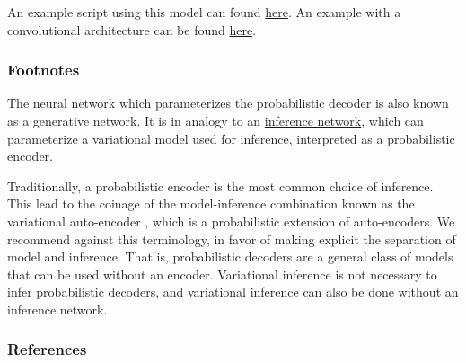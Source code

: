 An example script using this model can found
\href{https://github.com/blei-lab/edward/blob/master/examples/vae.py}
{here}. An example with a convolutional architecture can be found
\href{https://github.com/blei-lab/edward/blob/master/examples/vae_convolutional_prettytensor.py}
{here}.

\subsubsection{Footnotes}

The neural network which parameterizes the probabilistic decoder is
also known as a generative network. It is in analogy to an
\href{/tutorials/inference-networks}{inference network}, which
can parameterize a variational model used for inference,
interpreted as a probabilistic encoder.

Traditionally, a probabilistic encoder is the most common
choice of inference. This lead to the coinage of the model-inference
combination known as the variational auto-encoder
\citep{kingma2014auto}, which is a probabilistic extension of
auto-encoders.
We recommend against this terminology,
in favor of making explicit the separation of model and inference.
That is, probabilistic decoders are a general class of
models that can be used without an encoder.
Variational
inference is not necessary to infer probabilistic decoders, and
variational inference can also be done without an inference network.

\subsubsection{References}\label{references}

